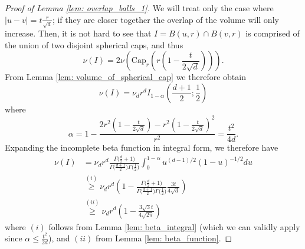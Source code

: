 \documentclass{article}
\newcommand{\abs}[1]{\left \lvert #1 \right \rvert}
\newcommand{\1}{\mathbf{1}}
\theoremstyle{alden}
\theoremstyle{aldenthm}
\theoremstyle{remark}
\begin{document}
\begin{proof}[Proof of Lemma \ref{lem: overlap_balls_1}]
	We will treat only the case where $\abs{u - v} = t\frac{r}{\sqrt{d}}$; if they are closer together the overlap of the volume will only increase. Then, it is not hard to see that $I = B(u,r) \cap B(v,r)$ is comprised of the union of two disjoint spherical caps, and thus
	\begin{equation*}
	\nu(I) = 2\nu(\mathrm{Cap}_r(r(1 - \frac{t}{2 \sqrt{d}}))).
	\end{equation*}
	From Lemma \ref{lem: volume_of_spherical_cap} we therefore obtain
	\begin{equation*}
	\nu(I) = \nu_d r^d I_{1 - \alpha}(\frac{d + 1}{2}; \frac{1}{2})
	\end{equation*}
	where
	\begin{equation*}
	\alpha = 1 - \frac{2r^2(1 - \frac{t}{2 \sqrt{d}}) - r^2(1 - \frac{t}{2 \sqrt{d}})^2}{r^2} = \frac{t^2}{4d}.
	\end{equation*}
	Expanding the incomplete beta function in integral form, we therefore have
	\begin{align*}
	\nu(I) & = \nu_d r^d \frac{\Gamma\bigl(\frac{d}{2}+ 1\bigr)}{\Gamma\bigl(\frac{d + 1}{2}\bigr) \Gamma\bigl(\frac{1}{2}\bigr)} \int_{0}^{1 - \alpha}u^{(d-1)/2}(1 - u)^{-1/2}du \\
	& \overset{(i)}{\geq} \nu_d r^d \left(1 - \frac{\Gamma\bigl(\frac{d}{2}+ 1\bigr)}{\Gamma\bigl(\frac{d + 1}{2}\bigr) \Gamma\bigl(\frac{1}{2}\bigr)} \frac{3 t}{4\sqrt{d}} \right) \\
	& \overset{(ii)}{\geq} \nu_d r^d \left(1 -  \frac{3 \sqrt{3} t}{4\sqrt{2\pi}} \right)
	\end{align*}
	where $(i)$ follows from Lemma \ref{lem: beta_integral} (which we can validly apply since $\alpha \leq \frac{t^2}{2d}$), and $(ii)$ from Lemma \ref{lem: beta_function}.
	
\end{proof}
\end{document}
